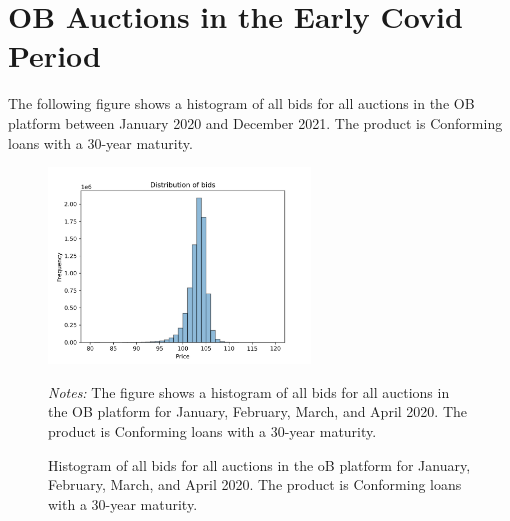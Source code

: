 \documentclass[11pt,a4paper]{article}
\begin{document}
\pagebreak
\section{OB Auctions in the Early Covid Period}


The following figure shows a histogram of all bids for all auctions in the OB platform between January 2020 and December 2021. 
The product is Conforming loans with a 30-year maturity. 



\begin{figure}[h]
    \centering
    \includegraphics[width=0.62\textwidth]{../results/figures/distribution_of_bids.png}
    \caption{Histogram of all bids for all auctions in the oB platform for January, February, March, and April 2020. The product is Conforming loans with a 30-year maturity.}
    \begin{minipage}{\textwidth}
        \footnotesize{\textit{Notes:} The figure shows a histogram of all bids for all auctions in the OB platform for January, February, March, and April 2020. The product is Conforming loans with a 30-year maturity. } 
        \end{minipage}
\end{figure}
\end{document}
